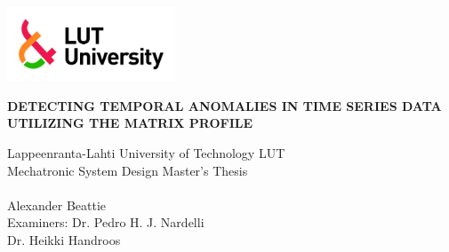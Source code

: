 \begin{flushleft}
\thispagestyle{empty}
\includegraphics[width=5cm]{Images/lut5.jpg}

\end{flushleft}

\begin{flushleft}
\vfill
\textbf{\uppercase{Detecting Temporal Anomalies in Time Series Data Utilizing the Matrix Profile}}\\
\vfill
\end{flushleft}

\begin{flushleft}

Lappeenranta-Lahti University of Technology LUT \\

Mechatronic System Design Master's Thesis \\

\the\year{} \\ 

Alexander Beattie \\

Examiners: Dr. Pedro H. J. Nardelli \\
\hspace{2.075cm} Dr. Heikki Handroos

\end{flushleft}